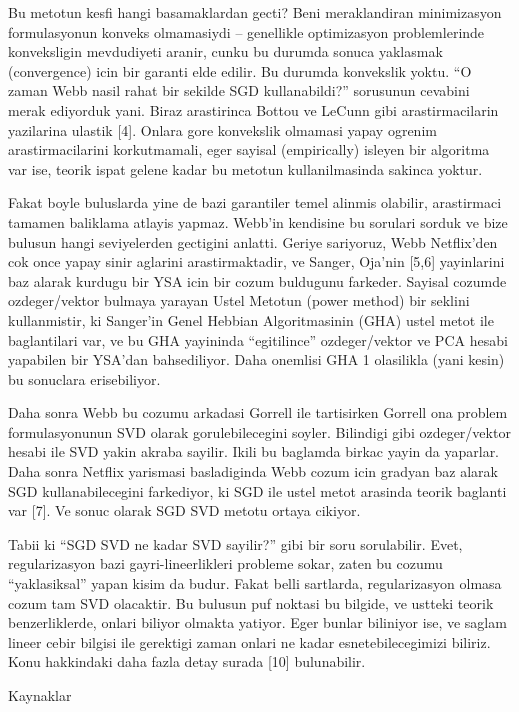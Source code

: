 \documentclass[12pt,fleqn]{article}\usepackage{../common}
\begin{document}
Bu metotun kesfi hangi basamaklardan gecti? Beni meraklandiran minimizasyon
formulasyonun konveks olmamasiydi -- genellikle optimizasyon problemlerinde
konveksligin mevdudiyeti aranir, cunku bu durumda sonuca yaklasmak
(convergence) icin bir garanti elde edilir. Bu durumda konvekslik
yoktu. ``O zaman Webb nasil rahat bir sekilde SGD kullanabildi?'' sorusunun
cevabini merak ediyorduk yani. Biraz arastirinca Bottou ve LeCunn gibi
arastirmacilarin yazilarina ulastik [4]. Onlara gore konvekslik olmamasi
yapay ogrenim arastirmacilarini korkutmamali, eger sayisal (empirically)
isleyen bir algoritma var ise, teorik ispat gelene kadar bu metotun
kullanilmasinda sakinca yoktur.

Fakat boyle buluslarda yine de bazi garantiler temel alinmis olabilir,
arastirmaci tamamen baliklama atlayis yapmaz. Webb'in kendisine bu sorulari
sorduk ve bize bulusun hangi seviyelerden gectigini anlatti. Geriye
sariyoruz, Webb Netflix'den cok once yapay sinir aglarini arastirmaktadir,
ve Sanger, Oja'nin [5,6] yayinlarini baz alarak kurdugu bir YSA icin bir
cozum buldugunu farkeder. Sayisal cozumde ozdeger/vektor bulmaya yarayan
Ustel Metotun (power method) bir seklini kullanmistir, ki Sanger'in Genel
Hebbian Algoritmasinin (GHA) ustel metot ile baglantilari var, ve bu GHA
yayininda ``egitilince'' ozdeger/vektor ve PCA hesabi yapabilen bir YSA'dan
bahsediliyor. Daha onemlisi GHA 1 olasilikla (yani kesin) bu sonuclara
erisebiliyor.

Daha sonra Webb bu cozumu arkadasi Gorrell ile tartisirken Gorrell ona
problem formulasyonunun SVD olarak gorulebilecegini soyler. Bilindigi gibi
ozdeger/vektor hesabi ile SVD yakin akraba sayilir. Ikili bu baglamda
birkac yayin da yaparlar. Daha sonra Netflix yarismasi basladiginda Webb
cozum icin gradyan baz alarak SGD kullanabilecegini farkediyor, ki SGD ile
ustel metot arasinda teorik baglanti var [7]. Ve sonuc olarak SGD SVD
metotu ortaya cikiyor.

Tabii ki ``SGD SVD ne kadar SVD sayilir?'' gibi bir soru sorulabilir. Evet,
regularizasyon bazi gayri-lineerlikleri probleme sokar, zaten bu cozumu
``yaklasiksal'' yapan kisim da budur. Fakat belli sartlarda, regularizasyon
olmasa cozum tam SVD olacaktir. Bu bulusun puf noktasi bu bilgide, ve
ustteki teorik benzerliklerde, onlari biliyor olmakta yatiyor. Eger bunlar
biliniyor ise, ve saglam lineer cebir bilgisi ile gerektigi zaman onlari ne
kadar esnetebilecegimizi biliriz. Konu hakkindaki daha fazla detay surada
[10] bulunabilir.

Kaynaklar
\end{document}

